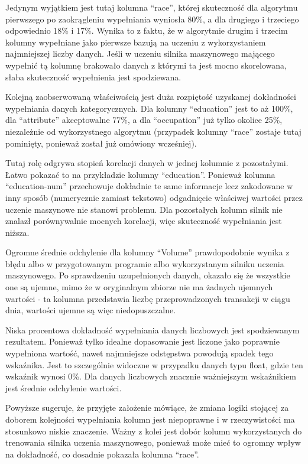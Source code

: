 \documentclass[12pt,twoside]{article}
\begin{document}
Jedynym wyjątkiem jest tutaj kolumna ``race'',
której skuteczność dla algorytmu pierwszego po zaokrągleniu wypełniania wyniosła 80\%,
a dla drugiego i trzeciego odpowiednio 18\% i 17\%.
Wynika to z faktu, że w algorytmie drugim i trzecim kolumny wypełniane jako pierwsze
bazują na uczeniu z wykorzystaniem najmniejszej liczby danych.
Jeśli w uczeniu silnika maszynowego mającego wypełnić tą kolumnę brakowało danych z którymi ta jest mocno skorelowana,
słaba skuteczność wypełnienia jest spodziewana.



Kolejną zaobserwowaną właściwością jest duża rozpiętość uzyskanej dokładności wypełniania danych kategorycznych.
Dla kolumny ``education'' jest to aż 100\%, dla ``attribute'' akceptowalne 77\%,
a dla ``occupation'' już tylko okolice 25\%, niezależnie od wykorzystnego algorytmu
(przypadek kolumny ``race'' zostaje tutaj pominięty, ponieważ został już omówiony wcześniej).

Tutaj rolę odgrywa stopień korelacji danych w jednej kolumnie z pozostałymi.
Łatwo pokazać to na przykładzie kolumny ``education''.
Ponieważ kolumna ``education-num'' przechowuje dokładnie te same informacje lecz zakodowane w inny sposób
(numerycznie zamiast tekstowo) odgadnięcie właściwej wartości przez uczenie maszynowe nie stanowi problemu.
Dla pozostałych kolumn silnik nie znalazł porównywalnie mocnych korelacji,
więc skuteczność wypełniania jest niższa.

Ogromne średnie odchylenie dla kolumny ``Volume'' prawdopodobnie wynika z błędu albo w przygotowanym programie albo
wykorzystanym silniku uczenia maszynowego. Po sprawdzeniu uzupełnionych danych, okazało się że wszystkie one są ujemne,
mimo że w oryginalnym zbiorze nie ma żadnych ujemnych wartości - ta kolumna przedstawia liczbę przeprowadzonych
transakcji w ciągu dnia, wartości ujemne są więc niedopuszczalne.

Niska procentowa dokładność wypełniania danych liczbowych jest spodziewanym rezultatem.
Ponieważ tylko idealne dopasowanie jest liczone jako poprawnie wypełniona wartość, nawet najmniejsze odstępstwa
powodują spadek tego wskaźnika. Jest to szczególnie widoczne w przypadku danych typu float, gdzie ten wskaźnik wynosi 0\%.
Dla danych liczbowych znacznie ważniejszym wskaźnikiem jest średnie odchylenie wartości.

Powyższe sugeruje, że przyjęte założenie mówiące, że zmiana logiki stojącej za doborem kolejności wypełniania kolumn
jest niepoprawne i w rzeczywistości ma stosunkowo niskie znaczenie.
Ważny z kolei jest dobór kolumn wykorzystanych do trenowania silnika uczenia maszynowego,
ponieważ może mieć to ogromny wpływ na dokładność, co dosadnie pokazała kolumna ``race''.
\end{document}
